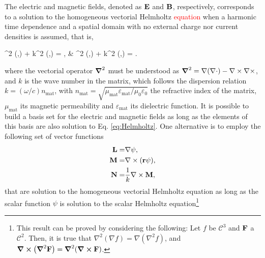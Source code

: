 
The electric and magnetic fields, denoted as $\vb{E}$ and $\vb{B}$, respectively, corresponds to a solution to the homogeneous vectorial Helmholtz \textcolor{red}{equation} when a harmonic time dependence and a spatial domain with no external charge nor current densities is assumed, that is,
%
\begin{tcolorbox}[title = Vectorial Helmholtz Equation,	ams align, breakable]
	\grad^2 (,\omega) + k^2 (,\omega) = ,
		\qquad&\qquad
  	\grad^2 (,\omega) + k^2 (,\omega) = .
  	\label{eq:Helmholtz}
\end{tcolorbox}
%
\noindent where the vectorial operator $\grad^2$ must be understood as $\grad^2 = \nabla(\nabla\cdot) - \nabla\times\nabla\times $, and $k$ is the wave number in the matrix, which follows the dispersion relation $k = (\omega/c) n_\text{mat}$, with $n_\text{mat}=\sqrt{\mu_\text{mat}\varepsilon_\text{mat} /\mu_0\varepsilon_0}$ the refractive index of the matrix, $\mu_\text{mat}$ its magnetic permeability and $\varepsilon_\text{mat}$ its dielectric function. It is possible to build a basis set for the electric and magnetic fields as long as the elements of this basis are also solution to Eq. \eqref{eq:Helmholtz}. One alternative is to employ the following set of vector functions \cite{stratton_electromagnetic_2012}
%
\begin{subequations}
\begin{align}
	\vb{L} =& \nabla \psi,
	\label{eq:L}\\
	\vb{M} =& \nabla\times(\vb{r}\psi),
	\label{eq:M}\\
	\vb{N} =&  \frac{1}{k}\nabla\times\vb{M},
	\label{eq:N}
\end{align}%
\label{eq:VSH}%
\end{subequations}
%
that are solution to the homogeneous vectorial Helmholtz equation as long as the scalar function $\psi$ is solution to the scalar Helmholtz equation\footnote{%
	This result can be proved by considering the following: Let $f$ be $\mathcal{C}^3$ and $\vb{F}$ a $\mathcal{C}^2$. Then, it is true that $\nabla^2(\nabla f) = \nabla(\nabla^2 f)$, and $\curl(\grad^2\vb{F}) = \grad^2(\curl\vb{F})$. }%
%
